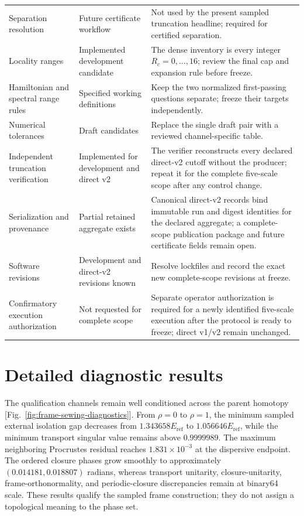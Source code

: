 \documentclass[11pt]{article}
\begin{document}
\begin{longtable}{@{}>{\raggedright\arraybackslash}p{}
                      >{\raggedright\arraybackslash}p{}
                      >{\raggedright\arraybackslash}p{}@{}}
Separation resolution & Future certificate workflow & Not used by the present sampled truncation headline; required for certified separation. \\
Locality ranges & Implemented development candidate & The dense inventory is every integer $R_c=0,\ldots,16$; review the final cap and expansion rule before freeze. \\
Hamiltonian and spectral range rules & Specified working definitions & Keep the two normalized first-passing questions separate; freeze their targets independently. \\
Numerical tolerances & Draft candidates & Replace the single draft pair with a reviewed channel-specific table. \\
Independent truncation verification & Implemented for development and direct v2 & The verifier reconstructs every declared direct-v2 cutoff without the producer; repeat it for the complete five-scale scope after any control change. \\
Serialization and provenance & Partial retained aggregate exists & Canonical direct-v2 records bind immutable run and digest identities for the declared aggregate; a complete-scope publication package and future certificate fields remain open. \\
Software revisions & Development and direct-v2 revisions known & Resolve lockfiles and record the exact new complete-scope revisions at freeze. \\
Confirmatory execution authorization & Not requested for complete scope & Separate operator authorization is required for a newly identified five-scale execution after the protocol is ready to freeze; direct v1/v2 remain unchanged. \\
\bottomrule
\end{longtable}
\normalsize

\section{Detailed diagnostic results}
\label{sec:diagnostic-results}

The qualification channels remain well conditioned across the parent homotopy
[Fig.~\ref{fig:frame-sewing-diagnostics}]. From $\rho=0$ to $\rho=1$, the minimum
sampled external isolation gap decreases from $1.343658E_{\mathrm{ref}}$ to $1.056646E_{\mathrm{ref}}$, while the minimum
transport singular value remains above $0.9999989$. The maximum neighboring Procrustes
residual reaches $1.831\times10^{-3}$ at the dispersive endpoint. The ordered closure
phases grow smoothly to approximately $(0.014181,0.018807)$ radians, whereas transport
unitarity, closure-unitarity, frame-orthonormality, and periodic-closure discrepancies remain
at binary64 scale. These results qualify the sampled frame construction; they do not
assign a topological meaning to the phase set.
\end{document}
